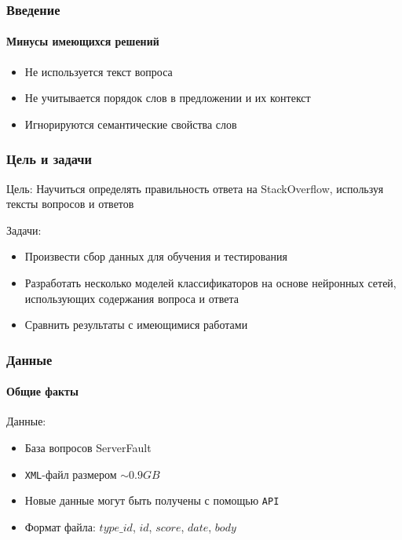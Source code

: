 \documentclass[10pt]{beamer}
\begin{document}
\begin{frame}
\frametitle{Введение}
\framesubtitle{Минусы имеющихся решений}

\begin{itemize}
	\setlength{\itemsep}{1em}
	\item Не используется текст вопроса
	\item Не учитывается порядок слов в предложении и их контекст
	\item Игнорируются семантические свойства слов
\end{itemize}

\end{frame}



\begin{frame}
\frametitle{Цель и задачи}

Цель: Научиться определять правильность ответа на StackOverflow, используя тексты вопросов и ответов

\medskip

Задачи:
\begin{itemize}
	\item Произвести сбор данных для обучения и тестирования
	\item Разработать несколько моделей классификаторов на основе нейронных сетей, использующих содержания вопроса и ответа
	\item Сравнить результаты с имеющимися работами
\end{itemize}


\end{frame}


\begin{frame}
\frametitle{Данные}
\framesubtitle{Общие факты}

Данные:

\begin{itemize}
	\item База вопросов ServerFault
	\item \texttt{XML}-файл размером $\sim0.9GB$
	\item Новые данные могут быть получены с помощью \texttt{API}
	\item Формат файла: $type\_id$, $id$, $score$, $date$, $body$
\end{itemize}

\end{frame}
\end{document}
